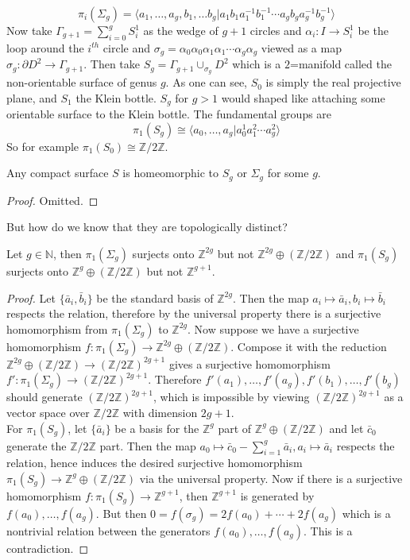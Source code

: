 $$\pi_i(\Sigma_g)=\langle a_1,\ldots,a_g,b_1,\ldots b_g|a_1b_1a_1^{-1}b_1^{-1}\cdots a_gb_ga_g^{-1}b_g^{-1}\rangle$$
Now take $\Gamma_{g+1}=\sum_{i=0}^gS_i^1$ as the wedge of $g+1$ circles and $\alpha_i:I\to S_i^1$ be the loop around the $i^{th}$ circle and $\sigma_g=\alpha_0\alpha_0\alpha_1\alpha_1\cdots\alpha_g\alpha_g$ viewed as a map $\sigma_g:\partial D^2\to\Gamma_{g+1}$.
Then take $S_g=\Gamma_{g+1}\cup_{\sigma_g}D^2$ which is a $2$=manifold called the non-orientable surface of genus $g$.
As one can see, $S_0$ is simply the real projective plane, and $S_1$ the Klein bottle.
$S_g$ for $g>1$ would shaped like attaching some orientable surface to the Klein bottle.
The fundamental groups are
$$\pi_1(S_g)\cong\langle a_0,\ldots,a_g|a_0^1a_1^2\cdots a_g^2\rangle$$
So for example $\pi_1(S_0)\cong\mathbb Z/2\mathbb Z$.
\begin{theorem}
    Any compact surface $S$ is homeomorphic to $S_g$ or $\Sigma_g$ for some $g$.
\end{theorem}
\begin{proof}
    Omitted.
\end{proof}
But how do we know that they are topologically distinct?
\begin{lemma}
    Let $g\in\mathbb N$, then $\pi_1(\Sigma_g)$ surjects onto $\mathbb Z^{2g}$ but not $\mathbb Z^{2g}\oplus(\mathbb Z/2\mathbb Z)$ and $\pi_1(S_g)$ surjects onto $\mathbb Z^g\oplus(\mathbb Z/2\mathbb Z)$ but not $\mathbb Z^{g+1}$.
\end{lemma}
\begin{proof}
    Let $\{\bar{a}_i,\bar{b}_i\}$ be the standard basis of $\mathbb Z^{2g}$.
    Then the map $a_i\mapsto\bar{a}_i,b_i\mapsto \bar{b}_i$ respects the relation, therefore by the universal property there is a surjective homomorphism from $\pi_1(\Sigma_g)$ to $\mathbb Z^{2g}$.
    Now suppose we have a surjective homomorphism $f:\pi_1(\Sigma_g)\to\mathbb Z^{2g}\oplus(\mathbb Z/2\mathbb Z)$.
    Compose it with the reduction $\mathbb Z^{2g}\oplus(\mathbb Z/2\mathbb Z)\to(\mathbb Z/2\mathbb Z)^{2g+1}$ gives a surjective homomorphism $f':\pi_1(\Sigma_g)\to(\mathbb Z/2\mathbb Z)^{2g+1}$.
    Therefore $f'(a_1),\ldots,f'(a_g),f'(b_1),\ldots,f'(b_g)$ should generate $(\mathbb Z/2\mathbb Z)^{2g+1}$, which is impossible by viewing $(\mathbb Z/2\mathbb Z)^{2g+1}$ as a vector space over $\mathbb Z/2\mathbb Z$ with dimension $2g+1$.\\
    For $\pi_1(S_g)$, let $\{\bar{a}_i\}$ be a basis for the $\mathbb Z^g$ part of $\mathbb Z^g\oplus(\mathbb Z/2\mathbb Z)$ and let $\bar{c}_0$ generate the $\mathbb Z/2\mathbb Z$ part.
    Then the map $a_0\mapsto \bar{c}_0-\sum_{i=1}^g\bar{a}_i, a_i\mapsto \bar{a}_i$ respects the relation, hence induces the desired surjective homomorphism $\pi_1(S_g)\to\mathbb Z^g\oplus(\mathbb Z/2\mathbb Z)$ via the universal property.
    Now if there is a surjective homomorphism $f:\pi_1(S_g)\to\mathbb Z^{g+1}$, then $\mathbb Z^{g+1}$ is generated by $f(a_0),\ldots,f(a_g)$.
    But then $0=f(\sigma_g)=2f(a_0)+\cdots+2f(a_g)$ which is a nontrivial relation between the generators $f(a_0),\ldots,f(a_g)$.
    This is a contradiction.
\end{proof}
